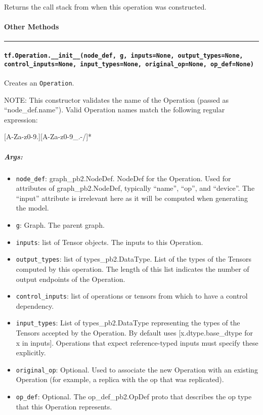 Returns the call stack from when this operation was constructed.

\paragraph{Other Methods }\label{other-methods}

\begin{center}\rule{0.5\linewidth}{\linethickness}\end{center}

\paragraph{\texorpdfstring{\lstinline{tf.Operation.__init__(node_def, g, inputs=None, output_types=None, control_inputs=None, input_types=None, original_op=None, op_def=None)}
}{tf.Operation.__init__(node_def, g, inputs=None, output_types=None, control_inputs=None, input_types=None, original_op=None, op_def=None) }}\label{tf.operation.ux5fux5finitux5fux5fnodeux5fdef-g-inputsnone-outputux5ftypesnone-controlux5finputsnone-inputux5ftypesnone-originalux5fopnone-opux5fdefnone}

Creates an \lstinline{Operation}.

NOTE: This constructor validates the name of the Operation (passed as
``node_def.name''). Valid Operation names match the following regular
expression:

{[}A-Za-z0-9.{]}{[}A-Za-z0-9_.-/{]}*

\subparagraph{Args: }\label{args-14}

\begin{itemize}
\tightlist
\item
  \lstinline{node_def}: graph_pb2.NodeDef. NodeDef for the Operation.
  Used for attributes of graph_pb2.NodeDef, typically ``name'', ``op'',
  and ``device''. The ``input'' attribute is irrelevant here as it will
  be computed when generating the model.
\item
  \lstinline{g}: Graph. The parent graph.
\item
  \lstinline{inputs}: list of Tensor objects. The inputs to this Operation.
\item
  \lstinline{output_types}: list of types_pb2.DataType. List of the types
  of the Tensors computed by this operation. The length of this list
  indicates the number of output endpoints of the Operation.
\item
  \lstinline{control_inputs}: list of operations or tensors from which to
  have a control dependency.
\item
  \lstinline{input_types}: List of types_pb2.DataType representing the
  types of the Tensors accepted by the Operation. By default uses
  {[}x.dtype.base_dtype for x in inputs{]}. Operations that expect
  reference-typed inputs must specify these explicitly.
\item
  \lstinline{original_op}: Optional. Used to associate the new Operation
  with an existing Operation (for example, a replica with the op that
  was replicated).
\item
  \lstinline{op_def}: Optional. The op_def_pb2.OpDef proto that
  describes the op type that this Operation represents.
\end{itemize}

